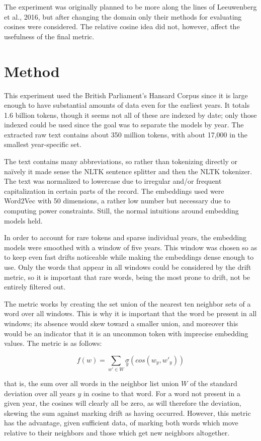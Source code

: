 \documentclass{article}
\begin{document}
The experiment was originally planned to be more along the lines of Leeuwenberg et al., 2016, but after changing the domain only their methods for evaluating cosines were considered. The relative cosine idea did not, however, affect the usefulness of the final metric.

\section{Method}
This experiment used the British Parliament's Hansard Corpus since it is large enough to have substantial amounts of data even for the earliest years. It totals 1.6 billion tokens, though it seems not all of these are indexed by date; only those indexed could be used since the goal was to separate the models by year. The extracted raw text contains about 350 million tokens, with about 17,000 in the smallest year-specific set.

The text contains many abbreviations, so rather than tokenizing directly or naïvely it made sense the NLTK sentence splitter and then the NLTK tokenizer. The text was normalized to lowercase due to irregular and/or frequent capitalization in certain parts of the record. The embeddings used were Word2Vec with 50 dimensions, a rather low number but necessary due to computing power constraints. Still, the normal intuitions around embedding models held.

In order to account for rare tokens and sparse individual years, the embedding models were smoothed with a window of five years. This window was chosen so as to keep even fast drifts noticeable while making the embeddings dense enough to use. Only the words that appear in all windows could be considered by the drift metric, so it is important that rare words, being the most prone to drift, not be entirely filtered out.

The metric works by creating the set union of the nearest ten neighbor sets of a word over all windows. This is why it is important that the word be present in all windows; its absence would skew toward a smaller union, and moreover this would be an indicator that it is an uncommon token with imprecise embedding values. The metric is as follows:

$$ f(w) = \sum_{w' \in W} \underset{y}\sigma(cos(w_y, w'_y)) $$

that is, the sum over all words in the neighbor list union $W$ of the standard deviation over all years $y$ in cosine to that word. For a word not present in a given year, the cosines will clearly all be zero, as will therefore the deviation, skewing the sum against marking drift as having occurred. However, this metric has the advantage, given sufficient data, of marking both words which move relative to their neighbors and those which get new neighbors altogether.
\end{document}
